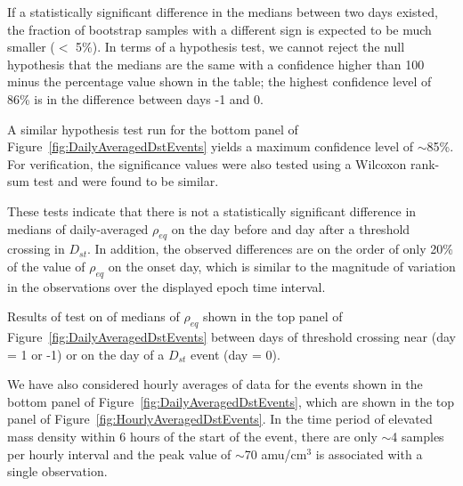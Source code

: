 \documentclass[draft,linenumbers]{agujournal}
\begin{document}
If a statistically significant difference in the medians between two days existed, the fraction of bootstrap samples with a different sign is expected to be much smaller ($<$ 5\%).  In terms of a hypothesis test, we cannot reject the null hypothesis that the medians are the same with a confidence higher than 100 minus the percentage value shown in the table; the highest confidence level of 86\% is in the difference between days -1 and 0.

A similar hypothesis test run for the bottom panel of Figure~\ref{fig:DailyAveragedDstEvents} yields a maximum confidence level of $\sim$85\%.  For verification, the significance values were also tested using a Wilcoxon rank-sum test and were found to be similar. 

These tests indicate that there is not a statistically significant difference in medians of daily-averaged $\rho_{eq}$ on the day before and day after a threshold crossing in $D_{st}$.  In addition, the observed differences are on the order of only 20\% of the value of $\rho_{eq}$ on the onset day, which is similar to the magnitude of variation in the observations over the displayed epoch time interval.  

\begin{table}
	\small
	\centering
	
	\caption{Results of test on of medians of $\rho_{eq}$ shown in the top panel of Figure~\ref{fig:DailyAveragedDstEvents} between days of threshold crossing  near (day = 1 or -1) or on the day of a $D_{st}$ event (day = 0).}
	\label{BootstrapDifferenceTable}
\end{table}

We have also considered hourly averages of data for the events shown in the bottom panel of Figure~\ref{fig:DailyAveragedDstEvents}, which are shown in the top panel of Figure~\ref{fig:HourlyAveragedDstEvents}.  In the time period of elevated mass density within 6 hours of the start of the event, there are only $\sim$4 samples per hourly interval and the peak value of $\sim$70 amu/cm$^3$ is associated with a single observation. 
\end{document}
